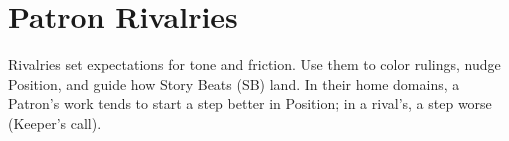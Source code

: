 























\section{Patron Rivalries}
\label{sec:patron-rivalries}

Rivalries set expectations for tone and friction. Use them to color rulings, nudge Position, and guide how Story Beats (SB) land. In their home domains, a Patron’s work tends to start a step better in Position; in a rival’s, a step worse (Keeper’s call).

